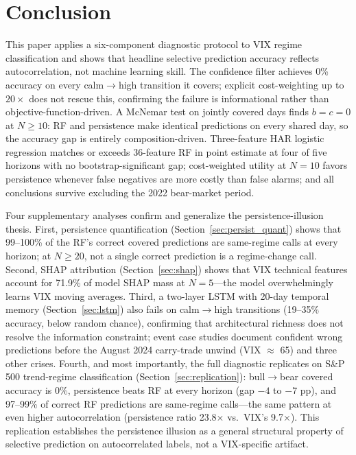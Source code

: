 \documentclass[12pt]{article}
\begin{document}
\section{Conclusion}
\label{sec:conclusion}

This paper applies a six-component diagnostic protocol to VIX regime classification and shows that headline selective prediction accuracy reflects autocorrelation, not machine learning skill. The confidence filter achieves 0\% accuracy on every calm$\to$high transition it covers; explicit cost-weighting up to $20{\times}$ does not rescue this, confirming the failure is informational rather than objective-function-driven. A McNemar test on jointly covered days finds $b = c = 0$ at $N \geq 10$: RF and persistence make identical predictions on every shared day, so the accuracy gap is entirely composition-driven. Three-feature HAR logistic regression matches or exceeds 36-feature RF in point estimate at four of five horizons with no bootstrap-significant gap; cost-weighted utility at $N = 10$ favors persistence whenever false negatives are more costly than false alarms; and all conclusions survive excluding the 2022 bear-market period.

Four supplementary analyses confirm and generalize the persistence-illusion thesis. First, persistence quantification (Section~\ref{sec:persist_quant}) shows that 99--100\% of the RF's correct covered predictions are same-regime calls at every horizon; at $N \geq 20$, not a single correct prediction is a regime-change call. Second, SHAP attribution (Section~\ref{sec:shap}) shows that VIX technical features account for 71.9\% of model SHAP mass at $N = 5$---the model overwhelmingly learns VIX moving averages. Third, a two-layer LSTM with 20-day temporal memory (Section~\ref{sec:lstm}) also fails on calm$\to$high transitions (19--35\% accuracy, below random chance), confirming that architectural richness does not resolve the information constraint; event case studies document confident wrong predictions before the August 2024 carry-trade unwind (VIX $\approx$ 65) and three other crises. Fourth, and most importantly, the full diagnostic replicates on S\&P 500 trend-regime classification (Section~\ref{sec:replication}): bull$\to$bear covered accuracy is 0\%, persistence beats RF at every horizon (gap $-4$ to $-7$ pp), and 97--99\% of correct RF predictions are same-regime calls---the same pattern at even higher autocorrelation (persistence ratio 23.8$\times$ vs.\ VIX's 9.7$\times$). This replication establishes the persistence illusion as a general structural property of selective prediction on autocorrelated labels, not a VIX-specific artifact.
\end{document}
